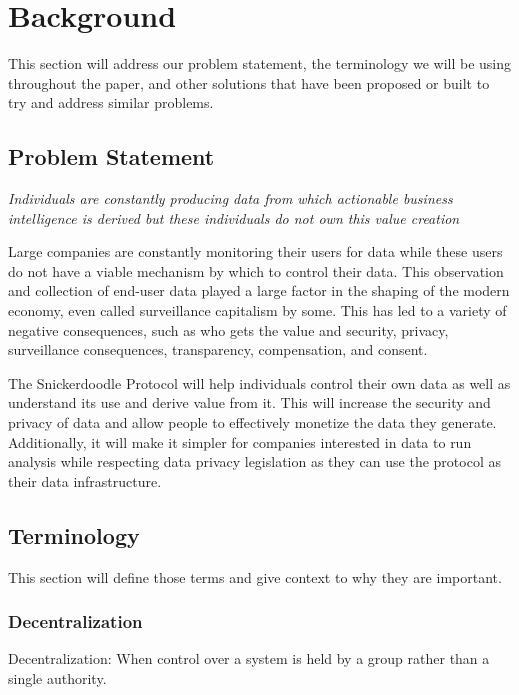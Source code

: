 \section{Background}

This section will address our problem statement, the terminology we will be using throughout the paper, and other solutions that have been proposed or built to try 
and address similar problems. 

\subsection{Problem Statement}


     

\textit{Individuals are constantly producing data from which actionable business intelligence is derived but these individuals do not own this value creation}
\newline
\newline

Large companies are constantly monitoring their users for data while these users do not have a viable mechanism by which to control their data. This observation 
and collection of end-user data played a large factor in the shaping of the modern economy, even called surveillance capitalism by some. This has led to a 
variety of negative consequences, such as who gets the value and security, privacy, surveillance consequences, transparency, compensation, and consent. 

The Snickerdoodle Protocol will help individuals control their own data as well as understand its use and derive value from it. This will increase the security 
and privacy of data and allow people to effectively monetize the data they generate. Additionally, it will make it simpler for companies interested in data to 
run analysis while respecting data privacy legislation as they can use the protocol as their data infrastructure.

\subsection{Terminology}

This section will define those terms and give context to why they are important.

\subsubsection{Decentralization}
\begin{definition}
\label{definition:Decentralization}
Decentralization: When control over a system is held by a group rather than a single authority.
\end{definition}

